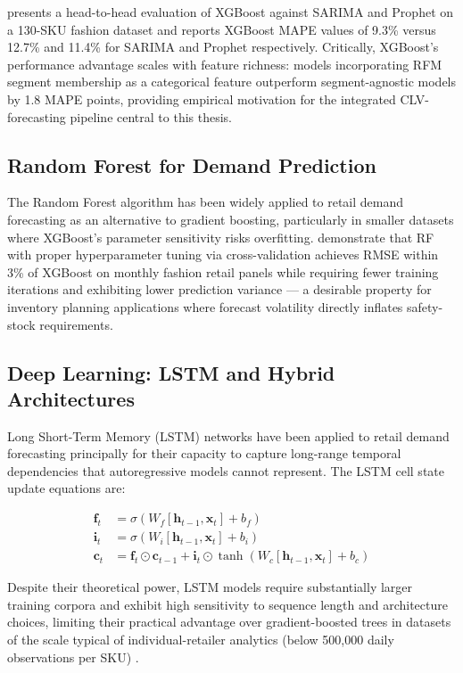 \cite{reportKuijt2022} presents a head-to-head evaluation of XGBoost against SARIMA and Prophet on a 130-SKU fashion dataset and reports XGBoost MAPE values of 9.3\% versus 12.7\% and 11.4\% for SARIMA and Prophet respectively. Critically, XGBoost's performance advantage scales with feature richness: models incorporating RFM segment membership as a categorical feature outperform segment-agnostic models by 1.8 MAPE points, providing empirical motivation for the integrated CLV-forecasting pipeline central to this thesis.

\subsection{Random Forest for Demand Prediction}

The Random Forest algorithm \cite{Breiman2001} has been widely applied to retail demand forecasting as an alternative to gradient boosting, particularly in smaller datasets where XGBoost's parameter sensitivity risks overfitting. \cite{mathematics2023RF} demonstrate that RF with proper hyperparameter tuning via cross-validation achieves RMSE within 3\% of XGBoost on monthly fashion retail panels while requiring fewer training iterations and exhibiting lower prediction variance — a desirable property for inventory planning applications where forecast volatility directly inflates safety-stock requirements.

\subsection{Deep Learning: LSTM and Hybrid Architectures}

Long Short-Term Memory (LSTM) networks \cite{Hochreiter1997} have been applied to retail demand forecasting principally for their capacity to capture long-range temporal dependencies that autoregressive models cannot represent. The LSTM cell state update equations are:

\begin{align}
    \mathbf{f}_t &= \sigma(W_f [\mathbf{h}_{t-1}, \mathbf{x}_t] + b_f) \label{eq:lstm_f} \\
    \mathbf{i}_t &= \sigma(W_i [\mathbf{h}_{t-1}, \mathbf{x}_t] + b_i) \label{eq:lstm_i} \\
    \mathbf{c}_t &= \mathbf{f}_t \odot \mathbf{c}_{t-1} + \mathbf{i}_t \odot \tanh(W_c [\mathbf{h}_{t-1}, \mathbf{x}_t] + b_c) \label{eq:lstm_c}
\end{align}

Despite their theoretical power, LSTM models require substantially larger training corpora and exhibit high sensitivity to sequence length and architecture choices, limiting their practical advantage over gradient-boosted trees in datasets of the scale typical of individual-retailer analytics (below 500,000 daily observations per SKU) \cite{1pdf_deep_learning}.

